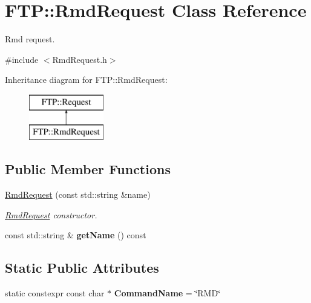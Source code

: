 \hypertarget{classFTP_1_1RmdRequest}{}\section{F\+T\+P\+:\+:Rmd\+Request Class Reference}
\label{classFTP_1_1RmdRequest}


Rmd request.  




{\ttfamily \#include $<$Rmd\+Request.\+h$>$}

Inheritance diagram for F\+T\+P\+:\+:Rmd\+Request\+:\begin{figure}[H]
\begin{center}
\leavevmode
\includegraphics[height=2.000000cm]{classFTP_1_1RmdRequest}
\end{center}
\end{figure}
\subsection*{Public Member Functions}
\begin{DoxyCompactItemize}
\item 
\hyperlink{classFTP_1_1RmdRequest_a3448c5596eaa91cecc3f28ed11daff21}{Rmd\+Request} (const std\+::string \&name)
\begin{DoxyCompactList}\small\item\em \hyperlink{classFTP_1_1RmdRequest}{Rmd\+Request} constructor. \end{DoxyCompactList}\item 
\hypertarget{classFTP_1_1RmdRequest_a35c6a64e5187959710215f04598a6320}{}const std\+::string \& {\bfseries get\+Name} () const \label{classFTP_1_1RmdRequest_a35c6a64e5187959710215f04598a6320}

\end{DoxyCompactItemize}
\subsection*{Static Public Attributes}
\begin{DoxyCompactItemize}
\item 
\hypertarget{classFTP_1_1RmdRequest_ae3771e8e3f539659d04cd4219ad09930}{}static constexpr const char $\ast$ {\bfseries Command\+Name} = \char`\"{}R\+M\+D\char`\"{}\label{classFTP_1_1RmdRequest_ae3771e8e3f539659d04cd4219ad09930}

\end{DoxyCompactItemize}


